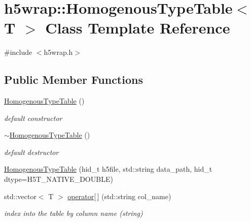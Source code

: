 \hypertarget{classh5wrap_1_1_homogenous_type_table}{}\section{h5wrap\+:\+:Homogenous\+Type\+Table$<$ T $>$ Class Template Reference}
\label{classh5wrap_1_1_homogenous_type_table}


{\ttfamily \#include $<$h5wrap.\+h$>$}

\subsection*{Public Member Functions}
\begin{DoxyCompactItemize}
\item 
\mbox{\label{classh5wrap_1_1_homogenous_type_table_a4abe000d3595d0ff78354bc5131b1ca7}} 
\hyperlink{classh5wrap_1_1_homogenous_type_table_a4abe000d3595d0ff78354bc5131b1ca7}{Homogenous\+Type\+Table} ()
\begin{DoxyCompactList}\small\item\em default constructor \end{DoxyCompactList}\item 
\mbox{\label{classh5wrap_1_1_homogenous_type_table_aa339bef26857f755e42035d4e054d7c7}} 
\hyperlink{classh5wrap_1_1_homogenous_type_table_aa339bef26857f755e42035d4e054d7c7}{$\sim$\+Homogenous\+Type\+Table} ()
\begin{DoxyCompactList}\small\item\em default destructor \end{DoxyCompactList}\item 
\hyperlink{classh5wrap_1_1_homogenous_type_table_a2fd7306656d5a16b4a44b50a9271eab3}{Homogenous\+Type\+Table} (hid\+\_\+t h5file, std\+::string data\+\_\+path, hid\+\_\+t dtype=H5\+T\+\_\+\+N\+A\+T\+I\+V\+E\+\_\+\+D\+O\+U\+B\+LE)
\item 
\mbox{\label{classh5wrap_1_1_homogenous_type_table_a961e0edb817f203b00367202d3c278b4}} 
std\+::vector$<$ T $>$ \hyperlink{classh5wrap_1_1_homogenous_type_table_a961e0edb817f203b00367202d3c278b4}{operator\mbox{[}$\,$\mbox{]}} (std\+::string col\+\_\+name)
\begin{DoxyCompactList}\small\item\em index into the table by column name (string) \end{DoxyCompactList}\item 

\end{DoxyCompactItemize}
